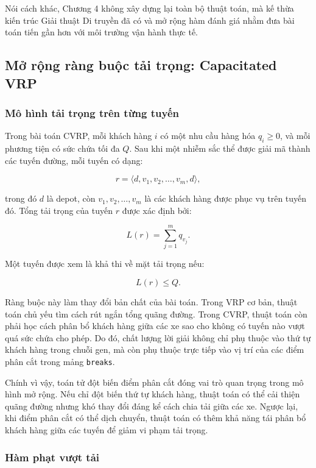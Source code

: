 \documentclass[12pt,a4paper]{article}
\numberwithin{figure}{subsection}
\numberwithin{table}{subsection}
\renewcommand{\geq}{\geqslant}
\renewcommand{\leq}{\leqslant}
\begin{document}
Nói cách khác, Chương 4 không xây dựng lại toàn bộ thuật toán, mà kế thừa kiến trúc Giải thuật Di truyền đã có và mở rộng hàm đánh giá nhằm đưa bài toán tiến gần hơn với môi trường vận hành thực tế.

\subsection{Mở rộng ràng buộc tải trọng: Capacitated VRP}

\subsubsection{Mô hình tải trọng trên từng tuyến}

Trong bài toán CVRP, mỗi khách hàng $i$ có một nhu cầu hàng hóa $q_i \geq 0$, và mỗi phương tiện có sức chứa tối đa $Q$. Sau khi một nhiễm sắc thể được giải mã thành các tuyến đường, mỗi tuyến có dạng:

\[
r = \langle d, v_1, v_2, \dots, v_m, d \rangle,
\]

trong đó $d$ là depot, còn $v_1, v_2, \dots, v_m$ là các khách hàng được phục vụ trên tuyến đó. Tổng tải trọng của tuyến $r$ được xác định bởi:

\[
L(r) = \sum_{j=1}^{m} q_{v_j}.
\]

Một tuyến được xem là khả thi về mặt tải trọng nếu:

\[
L(r) \leq Q.
\]

Ràng buộc này làm thay đổi bản chất của bài toán. Trong VRP cơ bản, thuật toán chủ yếu tìm cách rút ngắn tổng quãng đường. Trong CVRP, thuật toán còn phải học cách phân bổ khách hàng giữa các xe sao cho không có tuyến nào vượt quá sức chứa cho phép. Do đó, chất lượng lời giải không chỉ phụ thuộc vào thứ tự khách hàng trong chuỗi gen, mà còn phụ thuộc trực tiếp vào vị trí của các điểm phân cắt trong mảng \texttt{breaks}.

Chính vì vậy, toán tử đột biến điểm phân cắt đóng vai trò quan trọng trong mô hình mở rộng. Nếu chỉ đột biến thứ tự khách hàng, thuật toán có thể cải thiện quãng đường nhưng khó thay đổi đáng kể cách chia tải giữa các xe. Ngược lại, khi điểm phân cắt có thể dịch chuyển, thuật toán có thêm khả năng tái phân bổ khách hàng giữa các tuyến để giảm vi phạm tải trọng.

\subsubsection{Hàm phạt vượt tải}
\end{document}
